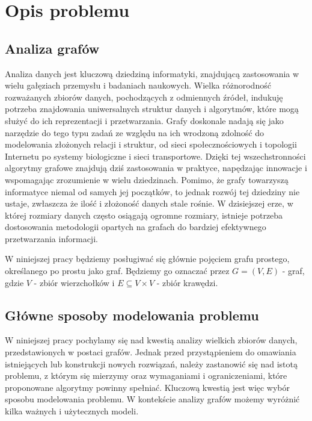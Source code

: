 \chapter{Opis problemu}

\section{Analiza grafów}
    Analiza danych jest kluczową dziedziną informatyki, znajdującą zastosowania w wielu gałęziach przemysłu i badaniach naukowych. Wielka różnorodność rozważanych zbiorów danych, pochodzących z odmiennych źródeł, indukuję potrzeba znajdowania uniwersalnych struktur danych i algorytmów, które mogą służyć do ich reprezentacji i przetwarzania. Grafy doskonale nadają się jako narzędzie do tego typu zadań ze względu na ich wrodzoną zdolność do modelowania złożonych relacji i struktur, od sieci społecznościowych i topologii Internetu po systemy biologiczne i sieci transportowe. Dzięki tej wszechstronności algorytmy grafowe znajdują dziś zastosowania w praktyce, napędzając innowacje i wspomagając zrozumienie w wielu dziedzinach.
    Pomimo, że grafy towarzyszą informatyce niemal od samych jej początków, to jednak rozwój tej dziedziny nie ustaje, zwłaszcza że ilość i złożoność danych stale rośnie. W dzisiejszej erze, w której rozmiary danych często osiągają ogromne rozmiary, istnieje potrzeba dostosowania metodologii opartych na grafach do bardziej efektywnego przetwarzania informacji. 

    W niniejszej pracy będziemy posługiwać się głównie pojęciem grafu prostego, określanego po prostu jako graf. Będziemy go oznaczać przez $G = (V,E)$ - graf, gdzie $V$ - zbiór wierzchołków i $E \subseteq V \times V$ - zbiór krawędzi.

\section{Główne sposoby modelowania problemu}
    W niniejszej pracy pochylamy się nad kwestią analizy wielkich zbiorów danych, przedstawionych w postaci grafów. Jednak przed przystąpieniem do omawiania istniejących lub konstrukcji nowych rozwiązań, należy zastanowić się nad istotą problemu, z którym się mierzymy oraz wymaganiami i ograniczeniami, które proponowane algorytmy powinny spełniać. Kluczową kwestią jest więc wybór sposobu modelowania problemu. W kontekście analizy grafów możemy wyróżnić kilka ważnych i użytecznych modeli.

